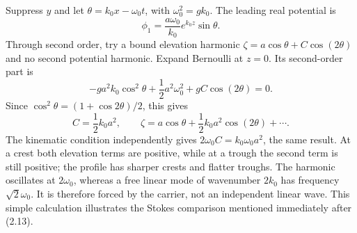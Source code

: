 Suppress $y$ and let $\theta=k_0x-\omega_0t$, with
$\omega_0^2=gk_0$. The leading real potential is
\[
 \phi_1=\frac{a\omega_0}{k_0}e^{k_0z}\sin\theta.
\]
Through second order, try a bound elevation harmonic
$\zeta=a\cos\theta+C\cos(2\theta)$ and no second potential harmonic.
Expand Bernoulli at $z=0$. Its second-order part is
\[
 -ga^2k_0\cos^2\theta+\frac12a^2\omega_0^2
                         +gC\cos(2\theta)=0.
\]
Since $\cos^2\theta=(1+\cos2\theta)/2$, this gives
\begin{equation}\label{eq:stokes-second}
 C=\frac12k_0a^2,\qquad
 \zeta=a\cos\theta+\frac12k_0a^2\cos(2\theta)+\cdots.
\end{equation}
The kinematic condition independently gives
$2\omega_0C=k_0\omega_0a^2$, the same result. At a crest both elevation
terms are positive, while at a trough the second term is still positive;
the profile has sharper crests and flatter troughs. The harmonic oscillates
at $2\omega_0$, whereas a free linear mode of wavenumber $2k_0$ has
frequency $\sqrt2\omega_0$. It is therefore forced by the carrier,
not an independent linear wave. This simple calculation illustrates
the Stokes comparison mentioned immediately after (2.13).

\clearpage
